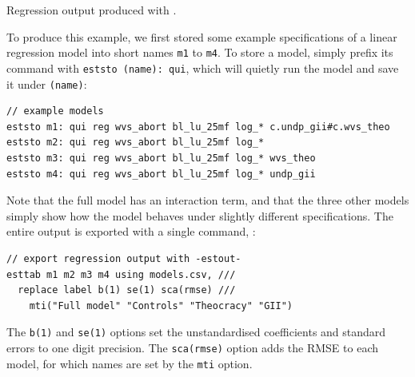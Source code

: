 
\begin{fullwidth}
	\begin{table}
		\footnotesize
    
		\caption{Regression output produced with .}
		\label{tbl:estout-reg}
	\end{table}
\end{fullwidth}

To produce this example, we first stored some example specifications of a linear regression model into short names \texttt{m1} to \texttt{m4}. To store a model, simply prefix its command with \texttt{eststo (name): qui}, which will quietly run the model and save it under \texttt{(name)}:

\begin{verbatim}
// example models
eststo m1: qui reg wvs_abort bl_lu_25mf log_* c.undp_gii#c.wvs_theo
eststo m2: qui reg wvs_abort bl_lu_25mf log_*
eststo m3: qui reg wvs_abort bl_lu_25mf log_* wvs_theo
eststo m4: qui reg wvs_abort bl_lu_25mf log_* undp_gii
\end{verbatim}

Note that the full model has an interaction term, and that the three other models simply show how the model behaves under slightly different specifications. The entire output is exported with a single command, :

\begin{verbatim}
// export regression output with -estout-
esttab m1 m2 m3 m4 using models.csv, ///
  replace label b(1) se(1) sca(rmse) ///
	mti("Full model" "Controls" "Theocracy" "GII")
\end{verbatim}

The \texttt{b(1)} and \texttt{se(1)} options set the unstandardised coefficients and standard errors to one digit precision. The \texttt{sca(rmse)} option adds the RMSE to each model, for which names are set by the \texttt{mti} option.
